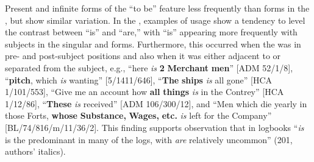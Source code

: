 Present  and infinite forms of the  “to be” feature less frequently than  forms in the , but show similar variation. In the , examples of usage show a tendency to level the contrast between “is” and “are,” with “is” appearing more frequently with  subjects in the singular and   forms. Furthermore, this occurred when the  was in pre- and post-subject positions and also when it was either adjacent to or separated from the subject, e.g., “here \textit{is} \textbf{2} \textbf{Merchant} \textbf{men}” [ADM 52/1/8], “\textbf{pitch}, which \textit{is} wanting” [5/1411/646], “\textbf{The} \textbf{ships} \textit{is} all gone” [HCA 1/101/553], “Give me an account how \textbf{all} \textbf{things} \textit{is} in the Contrey” [HCA 1/12/86], “\textbf{These} \textit{is} received” [ADM 106/300/12], and “Men which die yearly in those Forts, \textbf{whose} \textbf{Substance,} \textbf{Wages,} \textbf{etc.} \textit{is} left for the Company” [BL/74/816/m/11/36/2]. This finding supports  observation that in  logbooks “\textit{is} is the predominant  in many of the logs, with \textit{are} relatively uncommon” (201, authors’ italics). 

